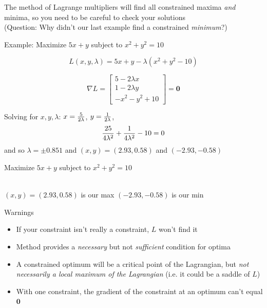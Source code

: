 \documentclass{beamer}
\numberwithin{equation}{section}
\begin{document}
\begin{frame}
The method of Lagrange multipliers will find all constrained maxima \textit{and} minima, so you need to be careful to check your solutions \\(Question: Why didn't our last example find a constrained \textit{minimum}?)

Example: Maximize $5x+y$ subject to $x^2+y^2=10$

$$L(x, y, \lambda)=5x+y-\lambda(x^2+y^2-10)$$

$$\nabla L=\begin{bmatrix}
5-2\lambda x\\
1-2 \lambda y\\
-x^2-y^2+10
\end{bmatrix} =\mathbf{0}$$

Solving for $x, y, \lambda$: $x={5\over 2\lambda}$, $y={1\over 2\lambda}$, $${{25}\over{4\lambda^2}}+{{1}\over{4\lambda^2}}-10=0 $$ and so $\lambda =\pm 0.851$  and $(x, y)=(2.93, 0.58)$ and $(-2.93, -0.58)$



\end{frame}


\begin{frame}
Maximize $5x+y$  subject to $x^2+y^2=10$

\ \\ $(x, y)=(2.93, 0.58)$ is our max $(-2.93, -0.58)$ is our min 

\begin{center}
\end{center}
\end{frame}



\begin{frame}{Warnings}


\begin{itemize}
\item If your constraint isn't really a constraint, $L$ won't find it
\item Method provides a \textit{necessary} but not \textit{sufficient} condition for optima
\item A constrained optimum will be a critical point of the Lagrangian, but \textit{not necessarily a local maximum of the Lagrangian} (i.e. it could be a saddle of $L$)
\item With one constraint, the gradient of the constraint at an optimum can't equal $\mathbf{0}$ 
\end{itemize}
\end{frame}
\end{document}

